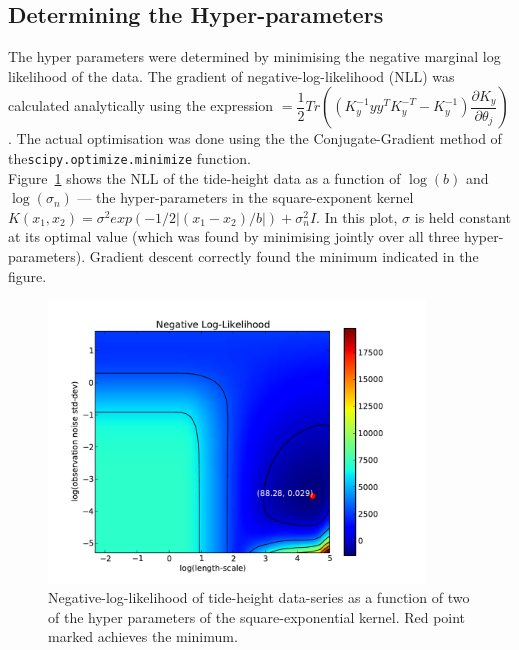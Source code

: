 \documentclass[11pt]{report}
\begin{document}
\subsection*{Determining the Hyper-parameters}
The hyper parameters were determined by minimising the negative marginal log likelihood of the data. The gradient of negative-log-likelihood (NLL) was calculated analytically using the expression $= \dfrac{1}{2}Tr\left( (K_y^{-1}yy^TK_y^{-T} - K_y^{-1}) \dfrac{\partial K_y}{\partial \theta_j}\right)$. The actual optimisation was done using the the Conjugate-Gradient method of the\texttt{scipy.optimize.minimize} function.\\

Figure~\ref{fig:f2} shows the NLL of the tide-height data as a function of $\log(b)$ and $\log(\sigma_n)$ --- the hyper-parameters in the square-exponent kernel $K(x_1,x_2)= \sigma^2exp(-1/2|(x_1-x_2)/b|) + \sigma_n^2I$. In this plot, $\sigma$ is held constant at its optimal value (which was found by minimising jointly over all three hyper-parameters). Gradient descent correctly found the minimum indicated in the figure.

\begin{figure}[h]
\begin{center}
\includegraphics[width=10cm]{figs/nll.pdf}
\caption{Negative-log-likelihood of tide-height data-series as a function of two of the hyper parameters of the square-exponential kernel. Red point marked achieves the minimum.}
\label{fig:f2}
\end{center}
\end{figure}
\clearpage
\end{document}
